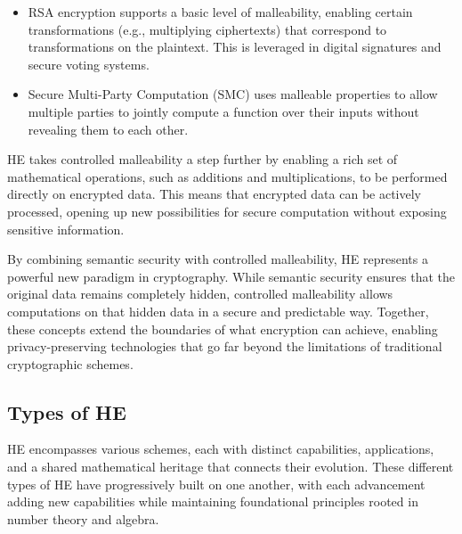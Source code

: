 \documentclass[
  letterpaper,
  DIV=11,
  numbers=noendperiod,
  oneside]{scrartcl}
\begin{document}
\begin{itemize}
\item
  RSA encryption supports a basic level of malleability, enabling
  certain transformations (e.g., multiplying ciphertexts) that
  correspond to transformations on the plaintext. This is leveraged in
  digital signatures and secure voting systems.
\item
  Secure Multi-Party Computation (SMC) uses malleable properties to
  allow multiple parties to jointly compute a function over their inputs
  without revealing them to each other.
\end{itemize}

HE takes controlled malleability a step further by enabling a rich set
of mathematical operations, such as additions and multiplications, to be
performed directly on encrypted data. This means that encrypted data can
be actively processed, opening up new possibilities for secure
computation without exposing sensitive information.

By combining semantic security with controlled malleability, HE
represents a powerful new paradigm in cryptography. While semantic
security ensures that the original data remains completely hidden,
controlled malleability allows computations on that hidden data in a
secure and predictable way. Together, these concepts extend the
boundaries of what encryption can achieve, enabling privacy-preserving
technologies that go far beyond the limitations of traditional
cryptographic schemes.

\subsection{Types of HE}\label{types-of-he}

HE encompasses various schemes, each with distinct capabilities,
applications, and a shared mathematical heritage that connects their
evolution. These different types of HE have progressively built on one
another, with each advancement adding new capabilities while maintaining
foundational principles rooted in number theory and algebra.
\end{document}
